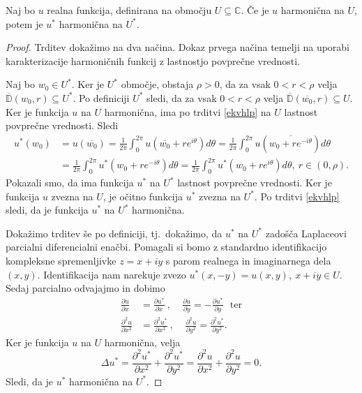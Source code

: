 \documentclass[mat1, tisk]{fmfdelo}
\begin{document}
    \begin{lema}
        \label{lemaharm}
        Naj bo $u$ realna funkcija, definirana na območju $U \subseteq \mathbb{C}$. Če je $u$ harmonična na $U$, potem je $u^*$ harmonična na $U^*$. 
    \end{lema}
    \begin{proof}
        Trditev dokažimo na dva načina. Dokaz prvega načina temelji na uporabi karakterizacije harmoničnih funkcij z lastnostjo povprečne vrednosti. 
        
        Naj bo \mbox{$w_0 \in U^*$}. Ker je $U^*$ območje, obstaja $\rho>0$, da za vsak $0 < r < \rho$ velja $\overline{\mathbb{D}}(w_0, r) \subseteq U^*$. Po definiciji $U^*$ sledi, da za vsak \mbox{$0 < r < \rho$} velja $\overline{\mathbb{D}}(\overline{w_0}, r) \subseteq U$. 
        Ker je funkcija $u$ na $U$ harmonična, ima po trditvi \ref{ekvhlp} na $U$ lastnost povprečne vrednosti. Sledi
        \begin{align*}
            u^*(w_0) & = u(\overline{w_0}) = \frac{1}{2 \pi} \int_{0}^{2 \pi}{u\left(\overline{w_0} + r e^{i \theta}\right) d\theta} = \frac{1}{2 \pi} \int_{0}^{2 \pi}{u\left(\overline{w_0 + r e^{-i \theta}}\right) d\theta}\\
            &= \frac{1}{2 \pi} \int_{0}^{2 \pi}{u^*\left(w_0 + r e^{-i \theta}\right) d\theta} = \frac{1}{2 \pi} \int_{0}^{2 \pi}{u^*\left(w_0 + r e^{i \theta}\right) d\theta},~r \in (0, \rho).
        \end{align*} 
        Pokazali smo, da ima funkcija $u^*$ na $U^*$ lastnost povprečne vrednosti. 
        Ker je funkcija $u$ zvezna na $U$, je očitno funkcija $u^*$ zvezna na $U^*$. 
        Po trditvi \ref{ekvhlp} sledi, da je funkcija $u^*$ na $U^*$ harmonična. 
        
        Dokažimo trditev še po definiciji, tj.\ dokažimo, da $u^*$ na $U^*$ zadošča Laplaceovi parcialni diferencialni enačbi.
        Pomagali si bomo z standardno identifikacijo kompleksne spremenljivke $z = x + iy$ s parom realnega in imaginarnega dela $(x,y)$.
        Identifikacija nam narekuje zvezo $u^*(x,-y) = u(x, y),~ x + iy \in U$.
        Sedaj parcialno odvajajmo in dobimo
        \begin{align*}
            \frac{\partial u}{\partial x} &= \frac{\partial u^* }{\partial x}~,~~~~~\frac{\partial u}{\partial y} = - \frac{\partial u^* }{\partial y}~~~\text{ter} \\
            \frac{\partial^2 u}{\partial x^2} & = \frac{\partial^2 u^* }{\partial x^2}~,~~~~~\frac{\partial^2 u}{\partial y^2} = \frac{\partial^2 u^* }{\partial y^2}.
        \end{align*}
        Ker je funkcija $u$ na $U$ harmonična, velja
        $$
            \Delta u^* = \frac{\partial^2 u^*}{\partial x^2} + \frac{\partial^2 u^*}{\partial y^2} = \frac{\partial^2 u}{\partial x^2} + \frac{\partial^2 u}{\partial y^2} = 0.
        $$
        Sledi, da je $u^*$ harmonična na $U^*$.
    \end{proof}
    
\end{document}
